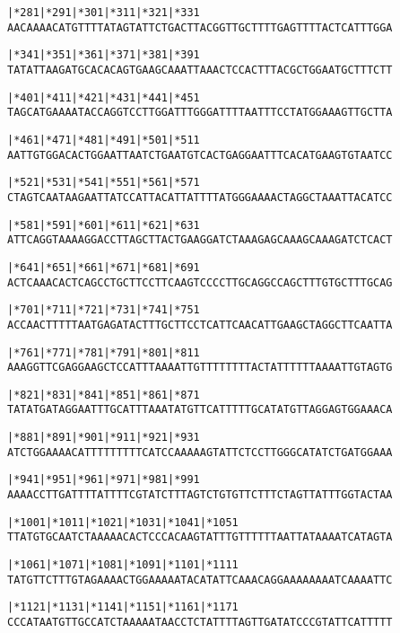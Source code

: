 \documentclass{article}
\begin{document}
\begin{alltt}
   |*281     |*291     |*301     |*311     |*321     |*331  
AACAAAACATGTTTTATAGTATTCTGACTTACGGTTGCTTTTGAGTTTTACTCATTTGGA

   |*341     |*351     |*361     |*371     |*381     |*391  
TATATTAAGATGCACACAGTGAAGCAAATTAAACTCCACTTTACGCTGGAATGCTTTCTT

   |*401     |*411     |*421     |*431     |*441     |*451  
TAGCATGAAAATACCAGGTCCTTGGATTTGGGATTTTAATTTCCTATGGAAAGTTGCTTA

   |*461     |*471     |*481     |*491     |*501     |*511  
AATTGTGGACACTGGAATTAATCTGAATGTCACTGAGGAATTTCACATGAAGTGTAATCC

   |*521     |*531     |*541     |*551     |*561     |*571  
CTAGTCAATAAGAATTATCCATTACATTATTTTATGGGAAAACTAGGCTAAATTACATCC

   |*581     |*591     |*601     |*611     |*621     |*631  
ATTCAGGTAAAAGGACCTTAGCTTACTGAAGGATCTAAAGAGCAAAGCAAAGATCTCACT

   |*641     |*651     |*661     |*671     |*681     |*691  
ACTCAAACACTCAGCCTGCTTCCTTCAAGTCCCCTTGCAGGCCAGCTTTGTGCTTTGCAG

   |*701     |*711     |*721     |*731     |*741     |*751  
ACCAACTTTTTAATGAGATACTTTGCTTCCTCATTCAACATTGAAGCTAGGCTTCAATTA

   |*761     |*771     |*781     |*791     |*801     |*811  
AAAGGTTCGAGGAAGCTCCATTTAAAATTGTTTTTTTTACTATTTTTTAAAATTGTAGTG

   |*821     |*831     |*841     |*851     |*861     |*871  
TATATGATAGGAATTTGCATTTAAATATGTTCATTTTTGCATATGTTAGGAGTGGAAACA

   |*881     |*891     |*901     |*911     |*921     |*931  
ATCTGGAAAACATTTTTTTTTCATCCAAAAAGTATTCTCCTTGGGCATATCTGATGGAAA

   |*941     |*951     |*961     |*971     |*981     |*991  
AAAACCTTGATTTTATTTTCGTATCTTTAGTCTGTGTTCTTTCTAGTTATTTGGTACTAA

   |*1001    |*1011    |*1021    |*1031    |*1041    |*1051 
TTATGTGCAATCTAAAAACACTCCCACAAGTATTTGTTTTTTAATTATAAAATCATAGTA

   |*1061    |*1071    |*1081    |*1091    |*1101    |*1111 
TATGTTCTTTGTAGAAAACTGGAAAAATACATATTCAAACAGGAAAAAAAATCAAAATTC

   |*1121    |*1131    |*1141    |*1151    |*1161    |*1171 
CCCATAATGTTGCCATCTAAAAATAACCTCTATTTTAGTTGATATCCCGTATTCATTTTT

\end{alltt}
\newpage
\end{document}
